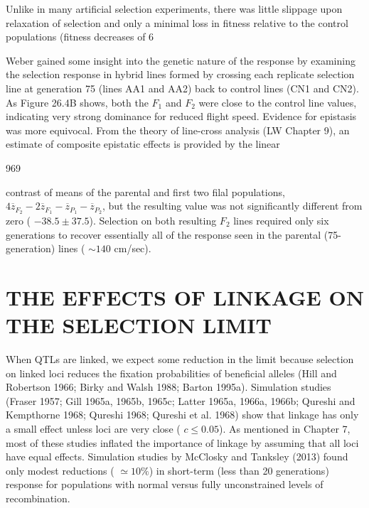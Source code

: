 \documentclass{article}
\begin{document}
Unlike in many artificial selection experiments, there was little slippage upon relaxation of selection and only a minimal loss in fitness relative to the control populations (fitness decreases of 6%

Weber gained some insight into the genetic nature of the response by examining the selection response in hybrid lines formed by crossing each replicate selection line at generation 75 (lines AA1 and AA2) back to control lines (CN1 and CN2). As Figure 26.4B shows, both the  $ F_{1} $ and  $ F_{2} $ were close to the control line values, indicating very strong dominance for reduced flight speed. Evidence for epistasis was more equivocal. From the theory of line-cross analysis (LW Chapter 9), an estimate of composite epistatic effects is provided by the linear

969

contrast of means of the parental and first two filal populations,  $ 4\overline{z}_{F_2} - 2\overline{z}_{F_1} - \overline{z}_{P_1} - \overline{z}_{P_2} $, but the resulting value was not significantly different from zero ( $ -38.5 \pm 37.5 $). Selection on both resulting  $ F_2 $ lines required only six generations to recover essentially all of the response seen in the parental (75-generation) lines ( $ \sim 140 $ cm/sec).

\section{THE EFFECTS OF LINKAGE ON THE SELECTION LIMIT}
When QTLs are linked, we expect some reduction in the limit because selection on linked loci reduces the fixation probabilities of beneficial alleles (Hill and Robertson 1966; Birky and Walsh 1988; Barton 1995a). Simulation studies (Fraser 1957; Gill 1965a, 1965b, 1965c; Latter 1965a, 1966a, 1966b; Qureshi and Kempthorne 1968; Qureshi 1968; Qureshi et al. 1968) show that linkage has only a small effect unless loci are very close ( $ c \leq 0.05 $). As mentioned in Chapter 7, most of these studies inflated the importance of linkage by assuming that all loci have equal effects. Simulation studies by McClosky and Tanksley (2013) found only modest reductions ( $ \simeq 10\% $) in short-term (less than 20 generations) response for populations with normal versus fully unconstrained levels of recombination.
\end{document}
